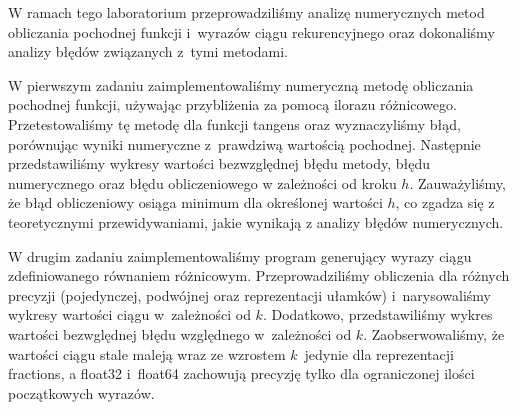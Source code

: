 \quad W ramach tego laboratorium przeprowadziliśmy analizę numerycznych metod obliczania pochodnej funkcji i~wyrazów ciągu rekurencyjnego oraz dokonaliśmy analizy błędów związanych z~tymi metodami.

W pierwszym zadaniu zaimplementowaliśmy numeryczną metodę obliczania pochodnej funkcji, używając przybliżenia za pomocą ilorazu różnicowego. Przetestowaliśmy tę metodę dla funkcji tangens oraz wyznaczyliśmy błąd, porównując wyniki numeryczne z~prawdziwą wartością pochodnej. Następnie przedstawiliśmy wykresy wartości bezwzględnej błędu metody, błędu numerycznego oraz błędu obliczeniowego w zależności od kroku $h$. Zauważyliśmy, że błąd obliczeniowy osiąga minimum dla określonej wartości $h$, co zgadza się z teoretycznymi przewidywaniami, jakie wynikają z analizy 
błędów numerycznych.

W drugim zadaniu zaimplementowaliśmy program generujący wyrazy ciągu zdefiniowanego równaniem różnicowym. Przeprowadziliśmy obliczenia dla różnych precyzji (pojedynczej, podwójnej oraz reprezentacji ułamków) i~narysowaliśmy wykresy wartości ciągu w~zależności od $k$. Dodatkowo, przedstawiliśmy wykres wartości bezwględnej błędu względnego w~zależności od $k$. 
Zaobserwowaliśmy, że wartości ciągu stale maleją wraz ze wzrostem $k$~jedynie dla reprezentacji fractions, a float32 i~float64 zachowują precyzję tylko dla ograniczonej ilości początkowych wyrazów.
